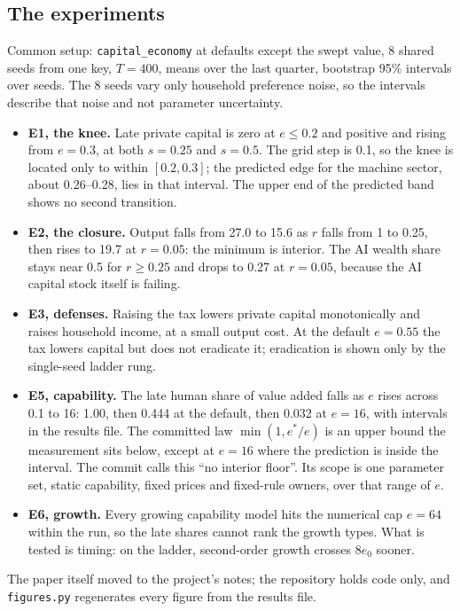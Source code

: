 \documentclass[11pt]{article}
\newcommand{\code}[1]{\texttt{#1}}
\begin{document}
\subsection{The experiments}

Common setup: \code{capital\_economy} at defaults except the swept value, 8 shared seeds
from one key, $T=400$, means over the last quarter, bootstrap 95\% intervals over seeds.
The 8 seeds vary only household preference noise, so the intervals describe that noise
and not parameter uncertainty.

\begin{itemize}
\item \textbf{E1, the knee.} Late private capital is zero at $e \le 0.2$ and positive
  and rising from $e=0.3$, at both $s=0.25$ and $s=0.5$. The grid step is 0.1, so the
  knee is located only to within $[0.2, 0.3]$; the predicted edge for the machine
  sector, about 0.26--0.28, lies in that interval. The upper end of the predicted band
  shows no second transition.
\item \textbf{E2, the closure.} Output falls from 27.0 to 15.6 as $r$ falls from 1 to
  0.25, then rises to 19.7 at $r=0.05$: the minimum is interior. The AI wealth share
  stays near 0.5 for $r \ge 0.25$ and drops to 0.27 at $r=0.05$, because the AI capital
  stock itself is failing.
\item \textbf{E3, defenses.} Raising the tax lowers private capital monotonically and
  raises household income, at a small output cost. At the default $e=0.55$ the tax
  lowers capital but does not eradicate it; eradication is shown only by the
  single-seed ladder rung.
\item \textbf{E5, capability.} The late human share of value added falls as $e$ rises
  across 0.1 to 16: 1.00, then 0.444 at the default, then 0.032 at $e=16$, with
  intervals in the results file. The committed law $\min(1, e^*/e)$ is an upper bound the
  measurement sits below, except at $e=16$ where the prediction is inside the interval.
  The commit calls this ``no interior floor''. Its scope is one parameter set, static
  capability, fixed prices and fixed-rule owners, over that range of $e$.
\item \textbf{E6, growth.} Every growing capability model hits the numerical cap
  $e=64$ within the run, so the late shares cannot rank the growth types. What is
  tested is timing: on the ladder, second-order growth crosses $8e_0$ sooner.
\end{itemize}

\noindent The paper itself moved to the project's notes; the repository holds code
only, and \code{figures.py} regenerates every figure from the results file.
\end{document}
